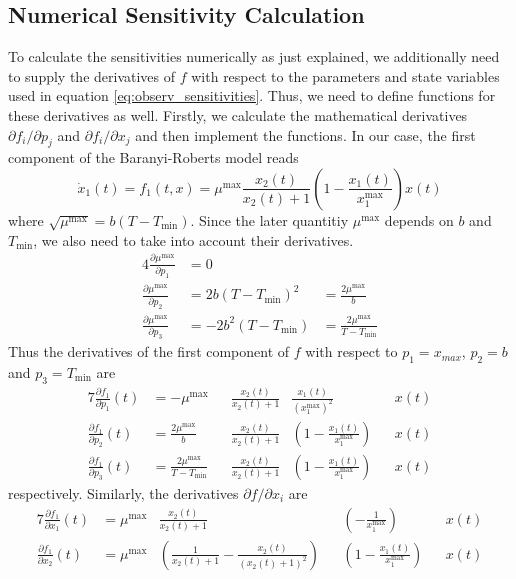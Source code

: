 \documentclass[10pt,A4paper]{article}
\begin{document}
\subsection*{Numerical Sensitivity Calculation}
To calculate the sensitivities numerically as just explained, we additionally need to supply the derivatives of $f$ with respect to the parameters and state variables used in equation \ref{eq:observ_sensitivities}.
Thus, we need to define functions for these derivatives as well.
Firstly, we calculate the mathematical derivatives $\partial f_i/\partial p_j$ and $\partial f_i/\partial x_j$ and then implement the functions.
In our case, the first component of the Baranyi-Roberts model reads
\begin{equation}
    \dot x_1(t) = f_1(t, x) = \mu^\text{max} \frac{x_2(t)}{x_2(t) + 1} \left(1 - \frac{x_1(t)}{x_1^\text{max}}\right) x(t)
\end{equation}
where $\sqrt{\mu^\text{max}}=b(T-T_\text{min})$.
Since the later quantitiy $\mu^\text{max}$ depends on $b$ and $T_\text{min}$, we also need to take into account their derivatives.
\begin{alignat}{4}
    \frac{\partial\mu^\text{max}}{\partial p_1} &= 0\\
    \frac{\partial\mu^\text{max}}{\partial p_2} &= 2b(T-T_\text{min})^2 &= \frac{2\mu^\text{max}}{b}\\
    \frac{\partial\mu^\text{max}}{\partial p_3} &= -2b^2(T-T_\text{min}) &= \frac{2\mu^\text{max}}{T-T_\text{min}}
\end{alignat}
Thus the derivatives of the first component of $f$ with respect to $p_1=x_{max}$, $p_2=b$ and $p_3=T_\text{min}$ are
\begin{alignat}{7}
    \frac{\partial f_1}{\partial p_1}(t) &= - \mu^\text{max} &&\frac{x_2(t)}{x_2(t) + 1} &\frac{x_1(t)}{\left(x_1^\text{max}\right)^2} &&x(t)\\
    \frac{\partial f_1}{\partial p_2}(t) &= \frac{2\mu^\text{max}}{b} &&\frac{x_2(t)}{x_2(t) + 1} &\left(1 - \frac{x_1(t)}{x_1^\text{max}}\right) &&x(t)\\
    \frac{\partial f_1}{\partial p_3}(t) &= \frac{2\mu^\text{max}}{T-T_\text{min}} &&\frac{x_2(t)}{x_2(t) + 1} &\left(1 - \frac{x_1(t)}{x_1^\text{max}}\right) &&x(t)
\end{alignat}
respectively.
Similarly, the derivatives $\partial f/\partial x_i$ are
\begin{alignat}{7}
    \frac{\partial f_1}{\partial x_1}(t) &= \mu^\text{max} &\frac{x_2(t)}{x_2(t) + 1} && \left(-\frac{1}{x_1^\text{max}}\right) &&x(t)\\
    \frac{\partial f_1}{\partial x_2}(t) &= \mu^\text{max} &\left(\frac{1}{x_2(t) + 1} - \frac{x_2(t)}{(x_2(t) + 1)^2}\right) && \left(1 - \frac{x_1(t)}{x_1^\text{max}}\right) &&x(t)
\end{alignat}
\end{document}
